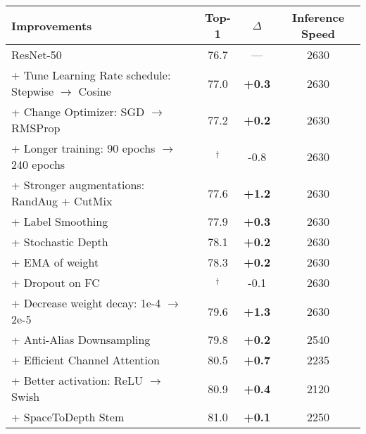 \newcommand{\improvement}[1]{\textcolor{blue}{#1}}
\newcommand{\decrease}[1]{\textcolor{red}{#1}}
\newcommand{\improvementb}[1]{\textbf{#1}}
\newcommand{\decreaseb}[1]{#1}
\begin{table}[ht!]
    \begin{center}
    \small
    \begin{tabular}{l|cc|c}
      \toprule
      Improvements & Top-1 & $\Delta$  & Inference Speed\\
      \hline
      \hline
      ResNet-50 & 76.7 & --- & 2630\\
      \rowcolor{blue!15}
      + Tune Learning Rate schedule: Stepwise $\rightarrow$ Cosine & 77.0 & \improvementb{+0.3} & 2630\\
      \rowcolor{blue!15}
      + Change Optimizer: SGD $\rightarrow$ RMSProp & 77.2 & \improvementb{+0.2} & 2630\\
      \rowcolor{blue!15}
      + Longer training: 90 epochs $\rightarrow$ 240 epochs& \;\;76.4 $^\dag$ & \decreaseb{-0.8} & 2630 \\
      \rowcolor{green!20}
      + Stronger augmentations: RandAug + CutMix & 77.6 & \improvementb{+1.2} & 2630\\
      \rowcolor{green!20}
      + Label Smoothing & 77.9 & \improvementb{+0.3} & 2630\\
      \rowcolor{green!20}
      + Stochastic Depth & 78.1 & \improvementb{+0.2} & 2630\\
      \rowcolor{green!20}
      + EMA of weight & 78.3 & \improvementb{+0.2} & 2630\\
      \rowcolor{green!20}
      + Dropout on FC & \;\;78.2 $^\dagger$ & \decreaseb{-0.1} & 2630\\
      \rowcolor{green!20}
      + Decrease weight decay: 1e-4 $\rightarrow$ 2e-5 & 79.6 & \improvementb{+1.3} & 2630\\
      \rowcolor{yellow!20}
      + Anti-Alias Downsampling & 79.8 & \improvementb{+0.2} & 2540 \\
      \rowcolor{yellow!20}
      + Efficient Channel Attention & 80.5 & \improvementb{+0.7} & 2235 \\
      \rowcolor{yellow!20}
      + Better activation: ReLU $\rightarrow$ Swish & 80.9 & \improvementb{+0.4} & 2120 \\
      \rowcolor{yellow!20}
      + SpaceToDepth Stem & 81.0 & \improvementb{+0.1} & 2250 \\

\end{tabular}
\end{center}
\end{table}
